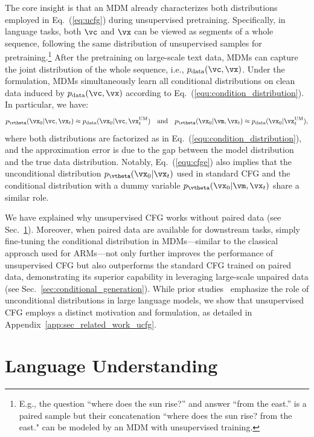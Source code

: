 \documentclass{article} %
\begin{document}
The core insight is that an MDM already characterizes both distributions employed in Eq.~(\ref{eq:ucfg}) during unsupervised pretraining. Specifically, in language tasks, both $\vc$ and $\vx$ can be viewed as segments of a whole sequence, following the same distribution of unsupervised samples for pretraining.\footnote{E.g., the question ``where does the sun rise?'' and answer ``from the east.'' is a paired sample but their concatenation ``where does the sun rise? from the east." can be modeled by an MDM with unsupervised training.} After the pretraining on large-scale text data, MDMs can capture the joint distribution of the whole sequence, i.e., $p_\textrm{data}(\vc,\vx)$.
Under the formulation, MDMs simultaneously learn all conditional distributions on clean data induced by $p_\textrm{data}(\vc,\vx)$ according to Eq.~(\ref{equ:condition_distribution}). In particular, we have:
\begin{align}
\label{equ:cfge}
    p_{\vtheta}(\vx_0|\vc, \vx_t) \approx p_{\text{data}}(\vx_0| \vc, \vx_t^{\text{UM}}) \quad \text{and} \quad p_{\vtheta}(\vx_0|\vm, \vx_t) \approx p_{\text{data}}(\vx_0|\vx_t^{\textrm{UM}}),
\end{align}
where both distributions are factorized as in Eq.~(\ref{equ:condition_distribution}), and the approximation error is due to the gap between the model distribution and the true data distribution. Notably, Eq.~(\ref{equ:cfge}) also implies that the unconditional distribution $p_{\vtheta}(\vx_0|\vx_t)$ used in standard CFG and the conditional distribution with a dummy variable $p_{\vtheta}(\vx_0|\vm, \vx_t)$ share a similar role.

We have explained why unsupervised CFG works without paired data (see Sec.~\ref{sec:qa}). Moreover, when paired data are available for downstream tasks, simply fine-tuning the conditional distribution in MDMs—similar to the classical approach used for ARMs—not only further improves the performance of unsupervised CFG but also outperforms the standard CFG trained on paired data, demonstrating its superior capability in leveraging large-scale unpaired data (see Sec.~\ref{sec:conditional_generation}). While prior studies~\cite{zhao2021calibrate, holtzman2021surface} emphasize the role of unconditional distributions in large language models, we show that unsupervised CFG employs a distinct motivation and formulation, as detailed in Appendix~\ref{app:sec_related_work_ucfg}.


\section{Language Understanding}
\label{sec:qa}
\end{document}
